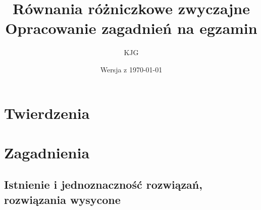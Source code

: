 \documentclass{mwrep}
\title{
  \huge \textbf{Równania różniczkowe zwyczajne} \\
  \Large Opracowanie zagadnień na egzamin
}
\author{ KJG }
\date{ Wersja z \today }
\DeclarePairedDelimiter\norm{\lVert}{\rVert}
\begin{document}
	
  \maketitle
  
  \tableofcontents
  
  \chapter{Twierdzenia}
  
  \chapter{Zagadnienia}
    \section{Istnienie i jednoznaczność rozwiązań, rozwiązania wysycone}
      
  
\end{document}
